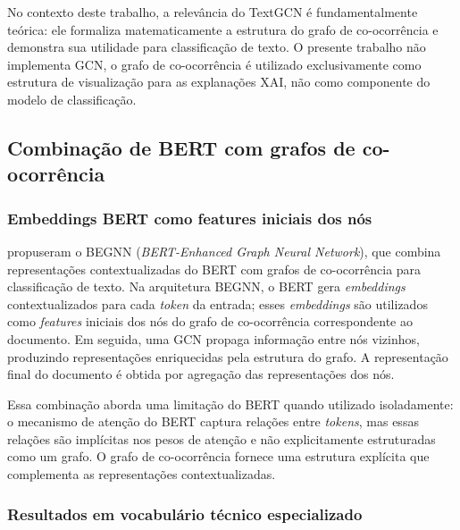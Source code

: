 \documentclass[
    12pt,                %
    openright,           %
    oneside,             %
    a4paper,             %
    english,             %
    brazil               %
]{abntex2}
\begin{document}
No contexto deste trabalho, a relevância do TextGCN é fundamentalmente teórica: ele formaliza matematicamente a estrutura do grafo de co-ocorrência e demonstra sua utilidade para classificação de texto. O presente trabalho não implementa GCN, o grafo de co-ocorrência é utilizado exclusivamente como estrutura de visualização para as explanações XAI, não como componente do modelo de classificação.

\subsection{Combinação de BERT com grafos de co-ocorrência}
\label{subsec:bert_grafo}

\subsubsection{Embeddings BERT como features iniciais dos nós}
\label{subsubsec:bert_grafo_embeddings}

 propuseram o BEGNN (\textit{BERT-Enhanced Graph Neural Network}), que combina representações contextualizadas do BERT com grafos de co-ocorrência para classificação de texto. Na arquitetura BEGNN, o BERT gera \textit{embeddings} contextualizados para cada \textit{token} da entrada; esses \textit{embeddings} são utilizados como \textit{features} iniciais dos nós do grafo de co-ocorrência correspondente ao documento. Em seguida, uma GCN propaga informação entre nós vizinhos, produzindo representações enriquecidas pela estrutura do grafo. A representação final do documento é obtida por agregação das representações dos nós.

Essa combinação aborda uma limitação do BERT quando utilizado isoladamente: o mecanismo de atenção do BERT captura relações entre \textit{tokens}, mas essas relações são implícitas nos pesos de atenção e não explicitamente estruturadas como um grafo. O grafo de co-ocorrência fornece uma estrutura explícita que complementa as representações contextualizadas.

\subsubsection{Resultados em vocabulário técnico especializado}
\label{subsubsec:bert_grafo_resultados}
\end{document}
